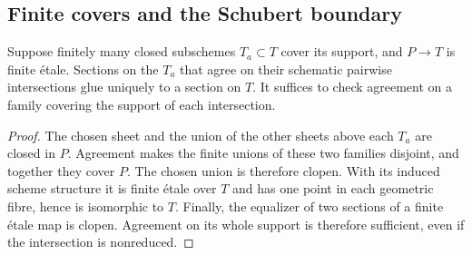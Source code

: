 \subsection{Finite covers and the Schubert boundary}
\begin{lemma}\label{tor:closed-gluing}
Suppose finitely many closed subschemes $T_a\subset T$ cover its support, and $P\longrightarrow T$ is finite \'etale. Sections on the $T_a$ that agree on their schematic pairwise intersections glue uniquely to a section on $T$. It suffices to check agreement on a family covering the support of each intersection.
\end{lemma}
\begin{proof}
The chosen sheet and the union of the other sheets above each $T_a$ are closed in $P$. Agreement makes the finite unions of these two families disjoint, and together they cover $P$. The chosen union is therefore clopen. With its induced scheme structure it is finite \'etale over $T$ and has one point in each geometric fibre, hence is isomorphic to $T$. Finally, the equalizer of two sections of a finite \'etale map is clopen. Agreement on its whole support is therefore sufficient, even if the intersection is nonreduced.
\end{proof}

